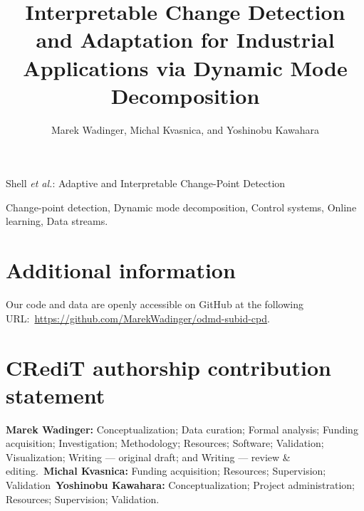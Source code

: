 \documentclass[journal]{IEEEtran}
\begin{document}
\title{Interpretable Change Detection and Adaptation for Industrial Applications via Dynamic Mode Decomposition}

\author{Marek Wadinger, Michal Kvasnica, and Yoshinobu Kawahara}

%
{Shell \MakeLowercase{\textit{et al.}}: Adaptive and Interpretable Change-Point Detection}

\IEEEpubid{}

\maketitle

\begin{abstract}

\end{abstract}

\begin{IEEEkeywords}
Change-point detection, Dynamic mode decomposition, Control systems, Online learning, Data streams.
\end{IEEEkeywords}

\linenumbers{}















\section*{Additional information}
Our code and data are openly accessible on GitHub at the following URL:~\url{https://github.com/MarekWadinger/odmd-subid-cpd}.

\section*{CRediT authorship contribution statement}
\textbf{Marek Wadinger:} Conceptualization; Data curation; Formal analysis; Funding acquisition; Investigation; Methodology; Resources; Software; Validation; Visualization; Writing --- original draft; and Writing --- review \& editing.~\textbf{Michal Kvasnica:} Funding acquisition; Resources; Supervision; Validation~\textbf{Yoshinobu Kawahara:} Conceptualization; Project administration; Resources; Supervision; Validation.
\end{document}
